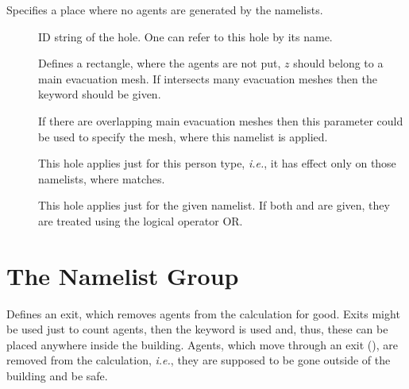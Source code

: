 \documentclass[12pt,a4paper,final,twoside]{stylevk}
\begin{document}
\noindent Specifies a place where no agents are generated by the
 namelists.
%
\begin{description}
%
\item[] ID string of the hole.  One can refer to this hole
  by its name.
%
\item[] Defines a rectangle, where the agents are not put,
  $z$ should belong to a main evacuation mesh.  If 
  intersects many evacuation meshes then the keyword 
  should be given.
%
\item[] If there are overlapping main evacuation
  meshes then this parameter could be used to specify the mesh, where
  this  namelist is applied.
%
\item[] This hole applies just for this person type,
  \emph{i.e.}, it has effect only on those  namelists,
  where  matches.
%
\item[] This hole applies just for the given 
  namelist.  If both  and  are given, they
  are treated using the logical operator OR.
%
\end{description}


\section{The  Namelist Group}\label{Sec_ExitNML}

\noindent Defines an exit, which removes agents from the calculation
for good.  Exits might be used just to count agents, then the keyword
  is used and, thus, these can be placed
anywhere inside the building.  Agents, which move through an exit
(), are removed from the calculation,
\emph{i.e.}, they are supposed to be gone outside of the building and
be safe.
\end{document}
